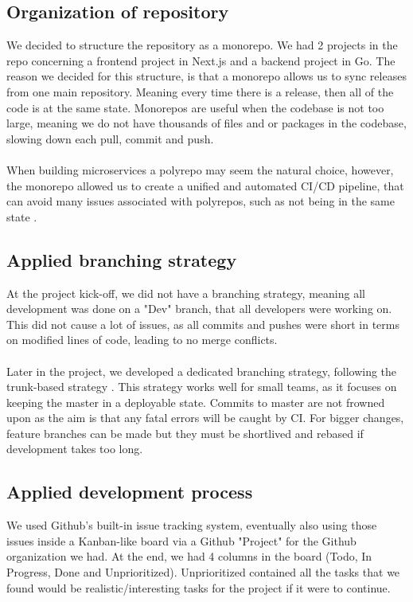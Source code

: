 \subsection{Organization of repository}
We decided to structure the repository as a monorepo. We had 2 projects in the repo concerning a frontend project in Next.js and a backend project in Go. The reason we decided for this structure, is that a monorepo allows us to sync releases from one main repository. Meaning every time there is a release, then all of the code is at the same state. Monorepos are useful when the codebase is not too large, meaning we do not have thousands of files and or packages in the codebase, slowing down each pull, commit and push.
\\\\
When building microservices a polyrepo may seem the natural choice, however, the monorepo allowed us to create a unified and automated CI/CD pipeline, that can avoid many issues associated with polyrepos, such as not being in the same state \cite{monorepo_pros}. 

\subsection{Applied branching strategy}\label{subsec:branching_strategy}
At the project kick-off, we did not have a branching strategy, meaning all development was done on a "Dev" branch, that all developers were working on. This did not cause a lot of issues, as all commits and pushes were short in terms on modified lines of code, leading to no merge conflicts.
\\\\
Later in the project, we developed a dedicated branching strategy, following the trunk-based strategy \cite{branching_strategy}. This strategy works well for small teams, as it focuses on keeping the master in a deployable state. Commits to master are not frowned upon as the aim is that any fatal errors will be caught by CI. For bigger changes, feature branches can be made but they must be shortlived and rebased if development takes too long. 

\subsection{Applied development process}
We used Github's built-in issue tracking system, eventually also using those issues inside a Kanban-like board via a Github "Project" for the Github organization we had. At the end, we had 4 columns in the board (Todo, In Progress, Done and Unprioritized). Unprioritized contained all the tasks that we found would be realistic/interesting tasks for the project if it were to continue. 
